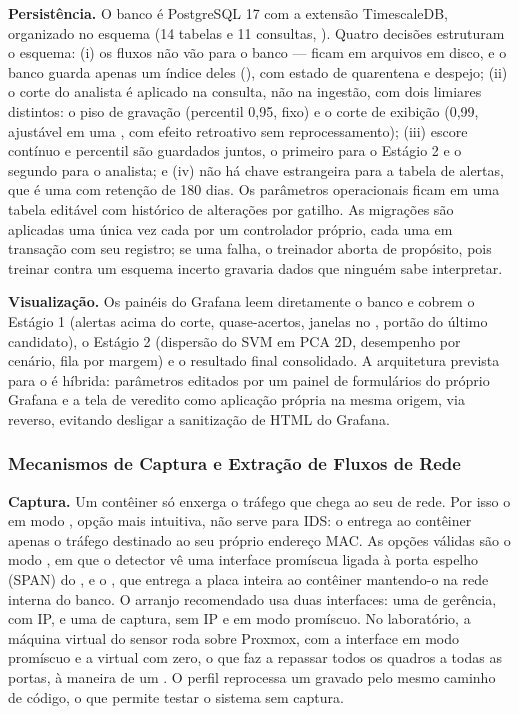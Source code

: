 \textbf{Persistência.} O banco é PostgreSQL 17 com a extensão TimescaleDB,
organizado no esquema  (14 tabelas e 11 consultas, ). Quatro
decisões estruturam o esquema: (i) os fluxos não vão para o banco --- ficam em
arquivos  em disco, e o banco guarda apenas um índice deles
(), com estado de quarentena e despejo; (ii) o corte do
analista é aplicado na consulta, não na ingestão, com dois limiares distintos: o
piso de gravação (percentil 0,95, fixo) e o corte de exibição (0,99, ajustável em
uma , com efeito retroativo sem reprocessamento); (iii) escore contínuo e
percentil são guardados juntos, o primeiro para o Estágio 2 e o segundo para o
analista; e (iv) não há chave estrangeira para a tabela de alertas, que é uma
 com retenção de 180 dias. Os parâmetros operacionais ficam em uma
tabela editável com histórico de alterações por gatilho. As migrações são
aplicadas uma única vez cada por um controlador próprio, cada uma em transação com
seu registro; se uma falha, o treinador aborta de propósito, pois treinar contra um
esquema incerto gravaria dados que ninguém sabe interpretar.

\textbf{Visualização.} Os painéis do Grafana leem diretamente o banco e cobrem o
Estágio 1 (alertas acima do corte, quase-acertos, janelas no , portão do
último candidato), o Estágio 2 (dispersão do SVM em PCA 2D, desempenho por cenário,
fila por margem) e o resultado final consolidado. A arquitetura prevista para o
 é híbrida: parâmetros editados por um painel de formulários do
próprio Grafana e a tela de veredito como aplicação própria na mesma origem, via
 reverso, evitando desligar a sanitização de HTML do Grafana.

\subsubsection{Mecanismos de Captura e Extração de Fluxos de Rede}
\label{sec:captura}

\textbf{Captura.} Um contêiner só enxerga o tráfego que chega ao seu
 de rede. Por isso o  em modo , opção mais
intuitiva, não serve para IDS: o  entrega ao contêiner apenas o tráfego
destinado ao seu próprio endereço MAC. As opções válidas são o modo , em
que o detector vê uma interface promíscua ligada à porta espelho (SPAN) do
, e o , que entrega a placa inteira ao contêiner
mantendo-o na rede interna do banco. O arranjo recomendado usa duas interfaces:
uma de gerência, com IP, e uma de captura, sem IP e em modo promíscuo. No
laboratório, a máquina virtual do sensor roda sobre Proxmox, com a interface em
modo promíscuo e a  virtual com  zero, o que faz a
 repassar todos os quadros a todas as portas, à maneira de um .
O perfil  reprocessa um  gravado pelo mesmo caminho de
código, o que permite testar o sistema sem captura.

